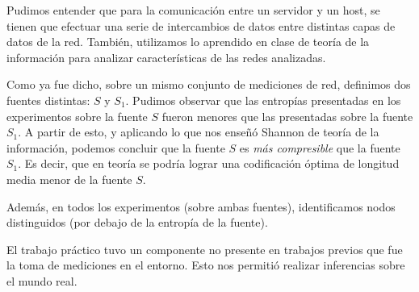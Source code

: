 \documentclass[final,inline,a4paper,narroweqnarray]{ieee}
\begin{document}
Pudimos entender que para la comunicación entre un
servidor y un host, se tienen que efectuar una serie
de intercambios de datos entre distintas capas de datos
de la red. También, utilizamos lo aprendido en clase
de teoría de la información para analizar características
de las redes analizadas.

Como ya fue dicho, sobre un mismo conjunto de mediciones
de red, definimos dos fuentes distintas: $S$ y $S_1$.
Pudimos observar que las entropías presentadas en los
experimentos sobre la fuente $S$ fueron menores que las
presentadas sobre la fuente $S_1$. A partir de esto, y
aplicando lo que nos enseñó Shannon de teoría de la
información, podemos concluir que la fuente $S$ es
\emph{más compresible} que la fuente $S_1$. Es decir, que
en teoría se podría lograr una codificación óptima de longitud
media menor de la fuente $S$.

Además, en todos los experimentos (sobre ambas fuentes),
identificamos nodos distinguidos (por debajo de la entropía de
la fuente).

El trabajo práctico tuvo un componente no presente en trabajos previos que fue la toma de mediciones en el entorno. Esto nos permitió realizar inferencias sobre el mundo real.
\end{document}
